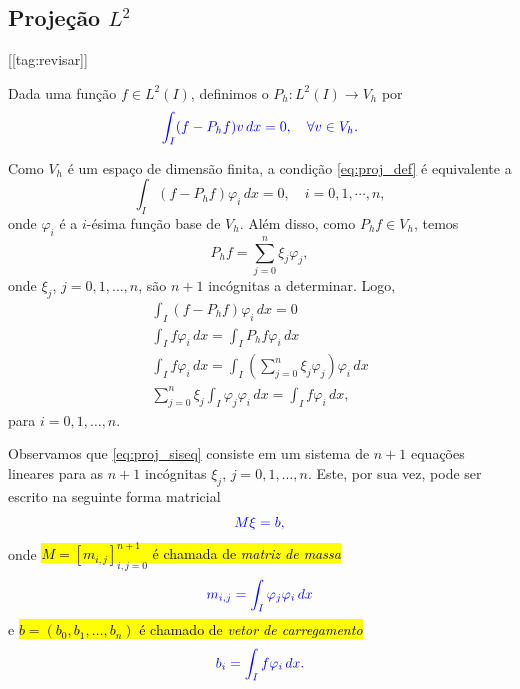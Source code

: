 \subsection{Projeção $L^2$}\label{subsec:projecao_1d}
[[tag:revisar]]

Dada uma função $f\in L^2(I)$, definimos o  $P_h:L^2(I)\to V_h$ por
\begin{equation}\label{eq:proj_def}\color{blue}\int_I (f-P_hf)v\,dx=0,\quad\forall v\in V_h.
\end{equation}

Como $V_h$ é um espaço de dimensão finita, a condição \eqref{eq:proj_def} é equivalente a
\begin{equation}\label{eq:proj_def}
  \int_I (f-P_hf)\varphi_i\,dx=0,\quad i=0, 1, \cdots, n,
\end{equation}
onde $\varphi_i$ é a $i$-ésima função base de $V_h$. Além disso, como $P_hf\in V_h$, temos
\begin{equation}
  P_hf = \sum_{j=0}^n\xi_j\varphi_j,
\end{equation}
onde $\xi_j$, $j=0, 1, \dotsc, n$, são $n+1$ incógnitas a determinar. Logo,
\begin{gather}
  \int_I (f-P_hf)\varphi_i\,dx=0 \\
  \int_I f\varphi_i\,dx = \int_I P_hf\varphi_i\,dx\\
  \int_I f\varphi_i\,dx = \int_I \left(\sum_{j=0}^n \xi_j\varphi_j\right)\varphi_i\,dx\\
  \sum_{j=0}^n \xi_j\int_I\varphi_j\varphi_i\,dx = \int_I f\varphi_i\,dx,\label{eq:proj_siseq}
\end{gather}
para $i=0, 1, \dotsc, n$.

Observamos que \eqref{eq:proj_siseq} consiste em um sistema de $n+1$ equações lineares para as $n+1$ incógnitas $\xi_j$, $j=0, 1, \dotsc, n$. Este, por sua vez, pode ser escrito na seguinte forma matricial
\begin{equation}\label{eq:proj_sis}\color{blue}M\xi = b,
\end{equation}
onde \hl{$M = [m_{i,j}]_{i,j=0}^{n+1}$ é chamada de \emph{matriz de massa}}
\begin{equation}\color{blue}m_{i,j} = \int_I\varphi_j\varphi_i\,dx
\end{equation}
e \hl{$b = (b_0, b_1, \dotsc, b_n)$ é chamado de \emph{vetor de carregamento}}
\begin{equation}\color{blue}b_i = \int_I f\varphi_i\,dx.
\end{equation}

